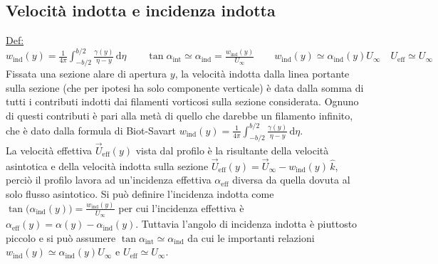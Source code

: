 \documentclass[11pt,a4paper]{report}
\newcommand{\de}{\mathrm d}
\begin{document}
		\subsection{Velocità indotta e incidenza indotta}	\label{vel ind}
		\underline{Def:} $w_\mathrm{ind}(y)=\frac{1}{4\pi}\int_{-b/2}^{b/2}\frac{\gamma(y)}{\eta-y}\,\de \eta\qquad\tan\alpha_\mathrm{int}\simeq\alpha_\mathrm{ind}=\frac{w_\mathrm{ind}(y)}{U_\infty}\qquad w_\mathrm{ind}(y)\simeq\alpha_\mathrm{ind}(y)U_\infty\quad U_\mathrm{eff}\simeq U_\infty$\\
		Fissata una sezione alare di apertura $y$, la velocità indotta dalla linea portante sulla sezione (che per ipotesi ha solo componente verticale) è data dalla somma di tutti i contributi indotti dai filamenti vorticosi sulla sezione considerata.  Ognuno di questi contributi è pari alla metà di quello che darebbe un filamento infinito, che è dato dalla formula di Biot-Savart $w_\mathrm{ind}(y)=\frac{1}{4\pi}\int_{-b/2}^{b/2}\frac{\gamma(y)}{\eta-y}\,\de \eta$.\\
		La velocità effettiva $\vec U_\mathrm{eff}(y)$ vista dal profilo è la risultante della velocità asintotica e della velocità indotta sulla sezione $\vec U_\mathrm{eff}(y)=\vec U_\infty-w_\mathrm{ind}(y)\,\hat k$, perciò il profilo lavora ad un'incidenza effettiva $\alpha_\mathrm{eff}$ diversa da quella dovuta al solo flusso asintotico. Si può definire l'incidenza indotta come $\tan\big(\alpha_\mathrm{ind}(y)\big)=\frac{w_\mathrm{ind}(y)}{U_\infty}$ per cui l'incidenza effettiva è $\alpha_\mathrm{eff}(y)=\alpha(y)-\alpha_\mathrm{ind}(y)$. Tuttavia l'angolo di incidenza indotta è piuttosto piccolo e si può assumere $\tan\alpha_\mathrm{int}\simeq\alpha_\mathrm{ind}$ da cui le importanti relazioni $w_\mathrm{ind}(y)\simeq\alpha_\mathrm{ind}(y)U_\infty$ e $U_\mathrm{eff}\simeq U_\infty$.
\end{document}
